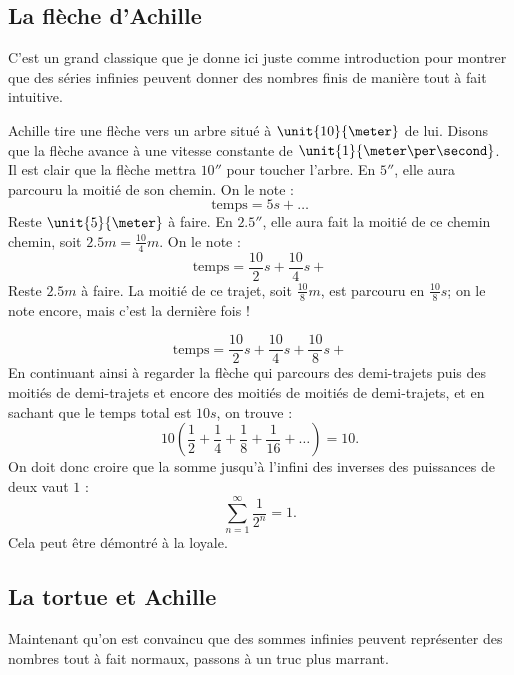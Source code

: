 \subsection{La flèche d'Achille}\label{s:un}

C'est un grand classique que je donne ici juste comme introduction pour montrer que des séries infinies peuvent donner des nombres finis de manière tout à fait intuitive.

Achille tire une flèche vers un arbre situé à $\unit{10}{\meter}$ de lui. Disons que la flèche avance à une vitesse constante de $\unit{1}{\meter\per\second}$. Il est clair que la flèche mettra $\unit{10}{\second}$ pour toucher l'arbre. En $\unit{5}{\second}$, elle aura parcouru la moitié de son chemin. On le note :
\[
\text{temps}=5s+\ldots
\]
Reste \( \unit{5}{\meter}\) à faire. En $\unit{2.5}{\second}$, elle aura fait la moitié de ce chemin chemin, soit $2.5m=\frac{10}{4}m$. On le note :
\[
\text{temps}=\frac{10}{2}s+\frac{10}{4}s+
\]
Reste $2.5m$ à faire. La moitié de ce trajet, soit $\frac{10}{8}m$, est parcouru en $\frac{10}{8}s$; on le note encore, mais c'est la dernière fois !

\[
\text{temps}=\frac{10}{2}s+\frac{10}{4}s+\frac{10}{8}s+
\]
En continuant ainsi à regarder la flèche qui parcours des demi-trajets puis des moitiés de demi-trajets et encore des moitiés de moitiés de demi-trajets, et en sachant que le temps total est $10s$, on trouve :
\[
10\left( \frac{1}{2}+\frac{1}{4}+\frac{1}{8}+\frac{1}{16}+\ldots  \right)=10.
\]
On doit donc croire que la somme jusqu'à l'infini des inverses des puissances de deux vaut $1$ :
\[
   \sum_{n=1}^{\infty}\frac{1}{2^n}=1.
\]
Cela peut être démontré à la loyale.

\subsection{La tortue et Achille}

Maintenant qu'on est convaincu que des sommes infinies peuvent représenter des nombres tout à fait normaux, passons à un truc plus marrant.

